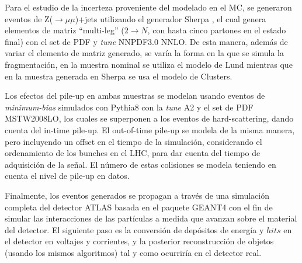 Para el estudio de la incerteza proveniente del modelado en el MC, se generaron eventos de Z($\rightarrow \mu\mu$)+jets utilizando el generador Sherpa \cite{Sherpa}, el cual genera elementos de matriz ``multi-leg'' ($2\rightarrow N$, con hasta cinco partones en el estado final) con el set de PDF y \textit{tune} NNPDF3.0 NNLO\cite{NNPDF}. De esta manera, además de variar el elemento de matriz generado, se varía la forma en la que se simula la fragmentación, en la muestra nominal se utiliza el modelo de Lund mientras que en la muestra generada en Sherpa se usa el modelo de Clusters.



Los efectos del pile-up en ambas muestras se modelan usando eventos de \textit{minimum-bias} simulados con Pythia8 con la \textit{tune} A2 y el set de PDF MSTW2008LO, los cuales se superponen a los eventos de hard-scattering, dando cuenta del in-time pile-up. El out-of-time pile-up se modela de la misma manera, pero incluyendo un offset en el tiempo de la simulación, considerando el ordenamiento de los bunches en el LHC, para dar cuenta del tiempo de adquisición de la señal. El número de estas colisiones se modela teniendo en cuenta el nivel de pile-up en datos. 


Finalmente, los eventos generados se propagan a través de una simulación completa del detector ATLAS basada en el paquete GEANT4 con el fin de simular las interacciones de las partículas a medida que avanzan sobre el material del detector. El siguiente paso es la conversión de depósitos de energía y $hits$ en el detector en voltajes y corrientes, y la posterior reconstrucción de objetos (usando los mismos algoritmos) tal y como ocurriría en el detector real. 

